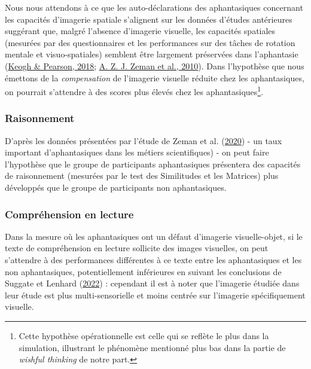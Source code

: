 \documentclass[
  12pt,
]{article}
\begin{document}
Nous nous attendons à ce que les auto-déclarations des aphantasiques
concernant les capacités d'imagerie spatiale s'alignent sur les données
d'études antérieures suggérant que, malgré l'absence d'imagerie
visuelle, les capacités spatiales (mesurées par des questionnaires et
les performances sur des tâches de rotation mentale et visuo-spatiales)
semblent être largement préservées dans l'aphantasie
(\protect\hyperlink{ref-keoghBlindMindNo2018}{Keogh \& Pearson, 2018};
\protect\hyperlink{ref-zemanLossImageryPhenomenology2010}{A. Z. J. Zeman
et al., 2010}). Dans l'hypothèse que nous émettons de la
\emph{compensation} de l'imagerie visuelle réduite chez les
aphantasiques, on pourrait s'attendre à des scores plus élevés chez les
aphantasiques\footnote{Cette hypothèse opérationnelle est celle qui se
  reflète le plus dans la simulation, illustrant le phénomène mentionné
  plus bas dans la partie  de \emph{wishful
  thinking} de notre part.}.

\hypertarget{raisonnement}{%
\subsubsection{Raisonnement}\label{raisonnement}}

D'après les données présentées par l'étude de Zeman et al.
(\protect\hyperlink{ref-zemanPhantasiaPsychologicalSignificance2020}{2020})
- un taux important d'aphantasiques dans les métiers scientifiques) - on
peut faire l'hypothèse que le groupe de participants aphantasiques
présentera des capacités de raisonnement (mesurées par le test des
Similitudes et les Matrices) plus développés que le groupe de
participants non aphantasiques.

\hypertarget{compruxe9hension-en-lecture}{%
\subsubsection{Compréhension en
lecture}\label{compruxe9hension-en-lecture}}

Dans la mesure où les aphantasiques ont un défaut d'imagerie
visuelle-objet, si le texte de compréhension en lecture sollicite des
images visuelles, on peut s'attendre à des performances différentes à ce
texte entre les aphantasiques et les non aphantasiques, potentiellement
inférieures en suivant les conclusions de Suggate et Lenhard
(\protect\hyperlink{ref-suggateMentalImagerySkill2022}{2022}) :
cependant il est à noter que l'imagerie étudiée dans leur étude est plus
multi-sensorielle et moins centrée sur l'imagerie spécifiquement
visuelle.
\end{document}
